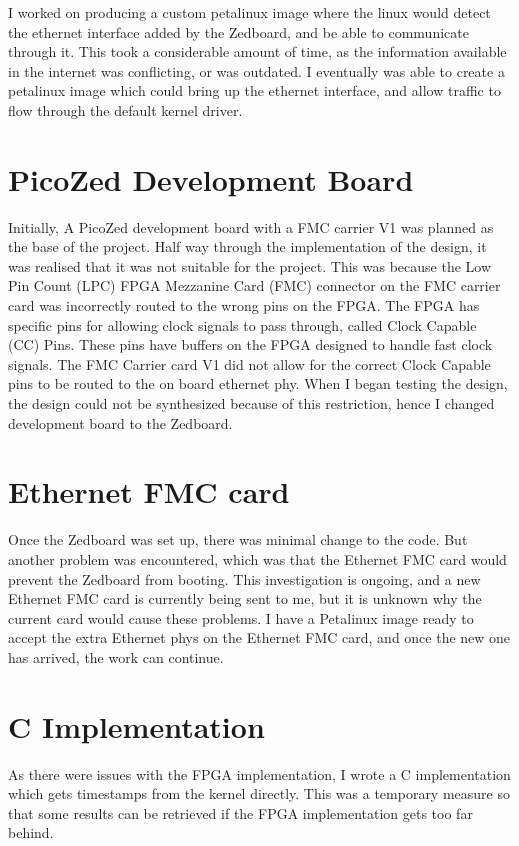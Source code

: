 \par I worked on producing a custom petalinux image where the linux would detect the ethernet interface added by the Zedboard, and be able to communicate through it.
This took a considerable amount of time, as the information available in the internet was conflicting, or was outdated.
I eventually was able to create a petalinux image which could bring up the ethernet interface, and allow traffic to flow through the default kernel driver.

\section{PicoZed Development Board}

\par Initially, A PicoZed development board with a FMC carrier V1 was planned as the base of the project.
Half way through the implementation of the design, it was realised that it was not suitable for the project.
This was because the Low Pin Count (LPC) FPGA Mezzanine Card (FMC) connector on the FMC carrier card was incorrectly routed to the wrong pins on the FPGA.
The FPGA has specific pins for allowing clock signals to pass through, called Clock Capable (CC) Pins.
These pins have buffers on the FPGA designed to handle fast clock signals.
The FMC Carrier card V1 did not allow for the correct Clock Capable pins to be routed to the on board ethernet phy.
When I began testing the design, the design could not be synthesized because of this restriction, hence I changed development board to the Zedboard.

\section{Ethernet FMC card}

\par Once the Zedboard was set up, there was minimal change to the code.
But another problem was encountered, which was that the Ethernet FMC card would prevent the Zedboard from booting.
This investigation is ongoing, and a new Ethernet FMC card is currently being sent to me, but it is unknown why the current card would cause these problems.
I have a Petalinux image ready to accept the extra Ethernet phys on the Ethernet FMC card, and once the new one has arrived, the work can continue.

\section{C Implementation}

\par As there were issues with the FPGA implementation, I wrote a C implementation which gets timestamps from the kernel directly.
This was a temporary measure so that some results can be retrieved if the FPGA implementation gets too far behind.
